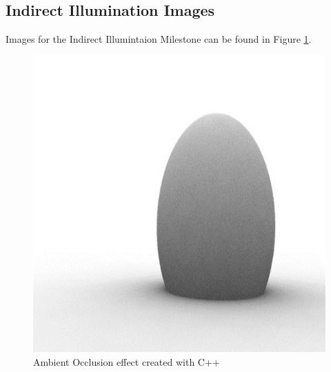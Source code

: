 \subsection{Indirect Illumination Images}
Images for the Indirect Illumintaion Milestone can be found in Figure \ref{fig:c++AO}.
\begin{figure}[ht]
\centering
\includegraphics[width=\textwidth]{figures/indirectIllumination-c++.png}
\caption{Ambient Occlusion effect created with C++}
\label{fig:c++AO}
\end{figure}

